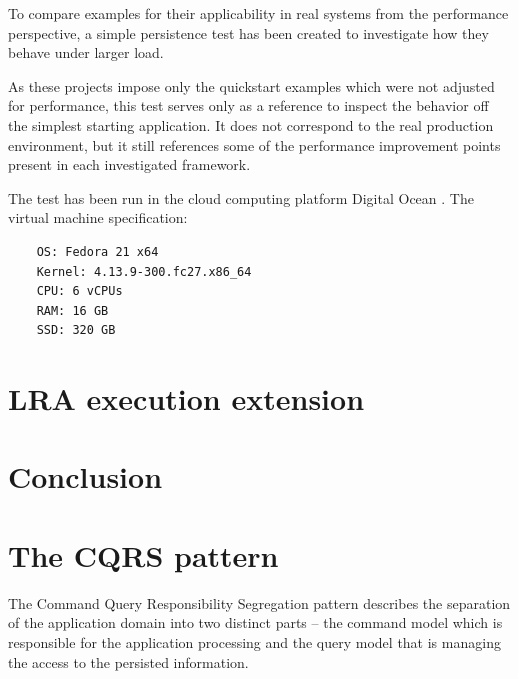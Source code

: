 \documentclass[oneside,
  digital, %
  table,   %
  nolof,     %
  nolot,     %
]{fithesis3}
\begin{document}
To compare examples for their applicability in real systems from the performance perspective, a simple persistence test has been created to investigate how they behave under larger load.

As these projects impose only the quickstart examples which were not adjusted for performance, this test serves only as a reference to inspect the behavior off the simplest starting application. It does not correspond to the real production environment, but it still references some of the performance improvement points present in each investigated framework.

The test has been run in the cloud computing platform Digital Ocean \cite{digital-ocean}. The virtual machine specification:

\begin{verbatim}
    OS: Fedora 21 x64
    Kernel: 4.13.9-300.fc27.x86_64
    CPU: 6 vCPUs
    RAM: 16 GB
    SSD: 320 GB
\end{verbatim}






\clearpage
\chapter{LRA execution extension}

\clearpage
\chapter{Conclusion}



\makeatletter\thesis@blocks@clear\makeatother
{} %
\printindex




\appendix %

\chapter{The CQRS pattern}
\label{sec:appendix-cqrs}

The Command Query Responsibility Segregation pattern describes the separation of the application domain into two distinct parts -- the command model which is responsible for the application processing and the query model that is managing the access to the persisted information. 
\end{document}
